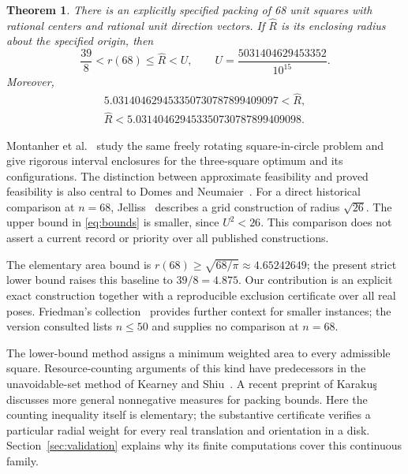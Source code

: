 \documentclass[11pt]{article}
\newtheorem{theorem}{Theorem}
\begin{document}
\begin{theorem}\label{thm:main}
There is an explicitly specified packing of 68 unit squares with rational centers and rational unit direction vectors. If $\widehat R$ is its enclosing radius about the specified origin, then
\begin{equation}\label{eq:bounds}
\frac{39}{8}<r(68)\le\widehat R<U,
\qquad U=\frac{5031404629453352}{10^{15}}.
\end{equation}
Moreover,
\begin{equation}\label{eq:isolation}
\begin{gathered}
5.031404629453350730787899409097
<\widehat R,\\
\widehat R<5.031404629453350730787899409098.
\end{gathered}
\end{equation}
\end{theorem}

Montanher et al.~\cite{montanher} study the same freely rotating square-in-circle problem and give rigorous interval enclosures for the three-square optimum and its configurations. The distinction between approximate feasibility and proved feasibility is also central to Domes and Neumaier~\cite{domes}. For a direct historical comparison at $n=68$, Jelliss~\cite{jelliss} describes a grid construction of radius $\sqrt{26}$. The upper bound in \eqref{eq:bounds} is smaller, since $U^2<26$. This comparison does not assert a current record or priority over all published constructions.

The elementary area bound is $r(68)\ge\sqrt{68/\pi}\approx4.65242649$; the present strict lower bound raises this baseline to $39/8=4.875$. Our contribution is an explicit exact construction together with a reproducible exclusion certificate over all real poses. Friedman's collection~\cite{friedman} provides further context for smaller instances; the version consulted lists $n\le50$ and supplies no comparison at $n=68$.

The lower-bound method assigns a minimum weighted area to every admissible square. Resource-counting arguments of this kind have predecessors in the unavoidable-set method of Kearney and Shiu~\cite{kearney}. A recent preprint of Karakuş~\cite{karakus} discusses more general nonnegative measures for packing bounds. Here the counting inequality itself is elementary; the substantive certificate verifies a particular radial weight for every real translation and orientation in a disk. Section~\ref{sec:validation} explains why its finite computations cover this continuous family.
\end{document}
